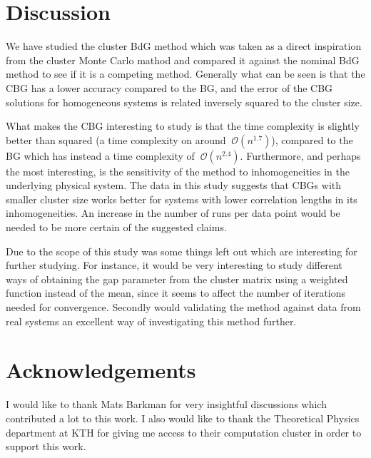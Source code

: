 \documentclass[11pt]{article}
\begin{document}
\section{Discussion}\label{sec:discussion}

We have studied the cluster BdG method which was taken as a direct inspiration from the cluster Monte Carlo mathod \cite{kumarTravellingClusterApproximation2006} and compared it against the nominal BdG method to see if it is a competing method. Generally what can be seen is that the CBG has a lower accuracy compared to the BG, and the error of the CBG solutions for homogeneous systems is related inversely squared to the cluster size. 

What makes the CBG interesting to study is that the time complexity is slightly better than squared (a time complexity on around $~\mathcal{O}(n^{1.7})$), compared to the BG which has instead a time complexity of $~\mathcal{O}(n^{2.4})$. Furthermore, and perhaps the most interesting, is the sensitivity of the method to inhomogeneities in the underlying physical system. The data in this study suggests that CBGs with smaller cluster size works better for systems with lower correlation lengths in its inhomogeneities. An increase in the number of runs per data point would be needed to be more certain of the suggested claims.  

Due to the scope of this study was some things left out which are interesting for further studying. For instance, it would be very interesting to study different ways of obtaining the gap parameter from the cluster matrix using a weighted function instead of the mean, since it seems to affect the number of iterations needed for convergence. Secondly would validating the method against data from real systems an excellent way of investigating this method further. 

\section{Acknowledgements}

I would like to thank Mats Barkman for very insightful discussions which contributed a lot to this work. I also would like to thank the Theoretical Physics department at KTH for giving me access to their computation cluster in order to support this work. 

\onecolumn
\end{document}
